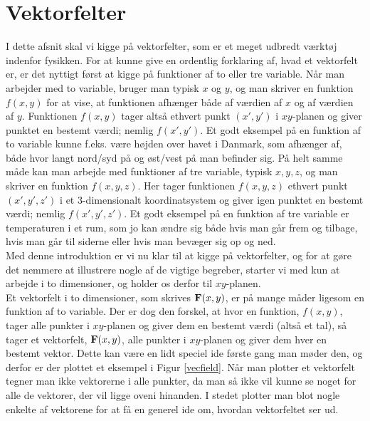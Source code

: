 \section{Vektorfelter}

I dette afsnit skal vi kigge på vektorfelter, som er et meget udbredt værktøj indenfor fysikken. For at kunne give en ordentlig forklaring af, hvad et vektorfelt er, er det nyttigt først at kigge på funktioner af to eller tre variable. Når man arbejder med to variable, bruger man typisk $x$ og $y$, og man skriver en funktion $f(x,y)$ for at vise, at funktionen afhænger både af værdien af $x$ og af værdien af $y$. Funktionen $f(x,y)$ tager altså ethvert punkt $(x',y')$ i $xy$-planen og giver punktet en bestemt værdi; nemlig $f(x',y')$. Et godt eksempel på en funktion af to variable kunne f.eks. være højden over havet i Danmark, som afhænger af, både hvor langt nord/syd på og øst/vest på man befinder sig. På helt samme måde kan man arbejde med funktioner af tre variable, typisk $x,y,z$, og man skriver en funktion $f(x,y,z)$. Her tager funktionen $f(x,y,z)$ ethvert punkt $(x',y',z')$ i et 3-dimensionalt koordinatsystem og giver igen punktet en bestemt værdi; nemlig $f(x',y',z')$. Et godt eksempel på en funktion af tre variable er temperaturen i et rum, som jo kan ændre sig både hvis man går frem og tilbage, hvis man går til siderne eller hvis man bevæger sig op og ned.\\
Med denne introduktion er vi nu klar til at kigge på vektorfelter, og for at gøre det nemmere at illustrere nogle af de vigtige begreber, starter vi med kun at arbejde i to dimensioner, og holder os derfor til $xy$-planen.\\

Et vektorfelt i to dimensioner, som skrives $\mathbf{F}(x,y)$, er på mange måder ligesom en funktion af to variable. Der er dog den forskel, at hvor en funktion, $f(x,y)$, tager alle punkter i $xy$-planen og giver dem en bestemt værdi (altså et tal), så tager et vektorfelt, $\mathbf{F}(x,y)$, alle punkter i $xy$-planen og giver dem hver en bestemt vektor. Dette kan være en lidt speciel ide første gang man møder den, og derfor er der plottet et eksempel i Figur \ref{vecfield}. Når man plotter et vektorfelt tegner man ikke vektorerne i alle punkter, da man så ikke vil kunne se noget for alle de vektorer, der vil ligge oveni hinanden. I stedet plotter man blot nogle enkelte af vektorene for at få en generel ide om, hvordan vektorfeltet ser ud.

